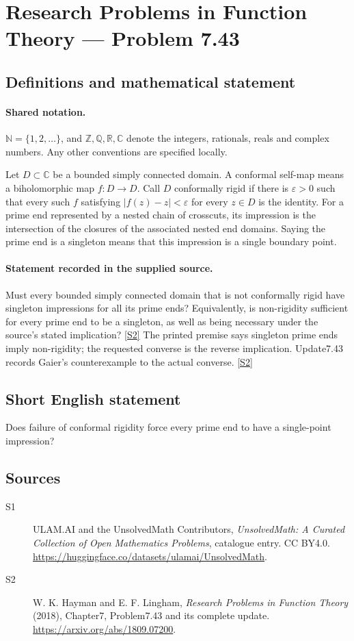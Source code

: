 \documentclass[11pt]{article}
\newcommand{\sref}[2]{\hyperlink{source:#1:#2}{[S#2]}}
\begin{document}
\section{Research Problems in Function Theory — Problem 7.43}\label{statement}

\subsection{Definitions and mathematical statement}

\paragraph{Shared notation.}$\mathbb N=\{1,2,\ldots\}$, and $\mathbb Z,\mathbb Q,\mathbb R,\mathbb C$ denote the integers, rationals, reals and complex numbers. Any other conventions are specified locally.


Let $D\subset\mathbb C$ be a bounded simply connected domain. A conformal self-map means a biholomorphic map $f:D\to D$. Call $D$ conformally rigid if there is $\varepsilon>0$ such that every such $f$ satisfying $|f(z)-z|<\varepsilon$ for every $z\in D$ is the identity. For a prime end represented by a nested chain of crosscuts, its impression is the intersection of the closures of the associated nested end domains. Saying the prime end is a singleton means that this impression is a single boundary point.

\paragraph{Statement recorded in the supplied source.}
Must every bounded simply connected domain that is not conformally rigid have singleton impressions for all its prime ends? Equivalently, is non-rigidity sufficient for every prime end to be a singleton, as well as being necessary under the source's stated implication? \sref{statement}{2}
The printed premise says singleton prime ends imply non-rigidity; the requested converse is the reverse implication. Update7.43 records Gaier's counterexample to the actual converse. \sref{statement}{2}
\subsection{Short English statement}
Does failure of conformal rigidity force every prime end to have a single-point impression?
\subsection{Sources}
\begin{description}
\item[\hypertarget{source:statement:1}{S1}] ULAM.AI and the UnsolvedMath Contributors, \emph{UnsolvedMath: A Curated Collection of Open Mathematics Problems}, catalogue entry. CC BY4.0. \url{https://huggingface.co/datasets/ulamai/UnsolvedMath}.
\item[\hypertarget{source:statement:2}{S2}] W. K. Hayman and E. F. Lingham, \emph{Research Problems in Function Theory} (2018), Chapter7, Problem7.43 and its complete update. \url{https://arxiv.org/abs/1809.07200}.
\end{description}
\label{end:statement}
\end{document}
